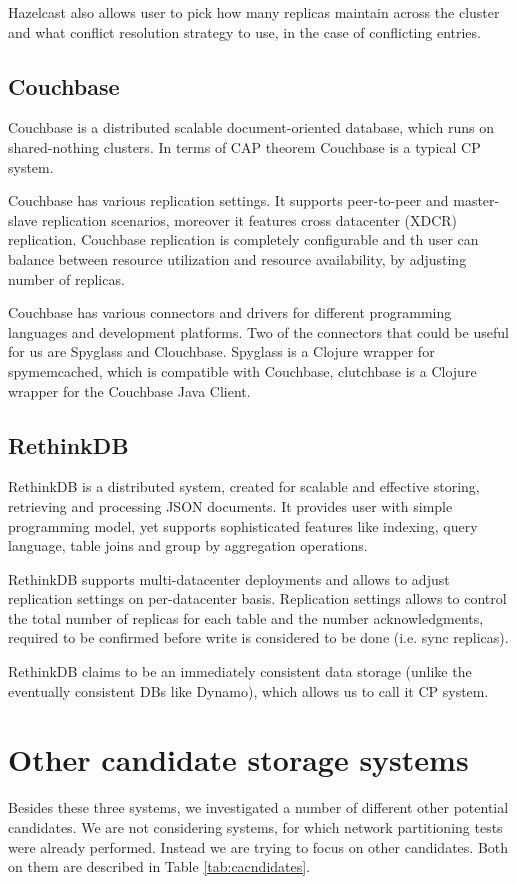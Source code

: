 \documentclass[a4paper]{article}
\begin{document}
Hazelcast also allows user to pick how many replicas maintain across the cluster and what conflict resolution strategy to use, in the case of conflicting entries.  

\subsection*{Couchbase}

Couchbase is a distributed scalable document-oriented database, which runs on shared-nothing clusters.
In terms of CAP theorem Couchbase is a typical CP system.

Couchbase has various replication settings.
It supports peer-to-peer and master-slave replication scenarios, moreover it features cross datacenter (XDCR) replication.
Couchbase replication is completely configurable and th user can balance between resource utilization and resource availability, by adjusting number of replicas.

Couchbase has various connectors and drivers for different programming languages and development platforms. 
Two of the connectors that could be useful for us are Spyglass and Clouchbase. 
Spyglass is a Clojure wrapper for spymemcached, which is compatible with Couchbase, clutchbase is a Clojure wrapper for the Couchbase Java Client.

\subsection*{RethinkDB}

RethinkDB is a distributed system, created for scalable and effective storing, retrieving and processing JSON documents.
It provides user with simple programming model, yet supports sophisticated features like indexing, query language, table joins and group by aggregation operations.

RethinkDB supports multi-datacenter deployments and allows to adjust replication settings on per-datacenter basis.
Replication settings allows to control the total number of replicas for each table and the number acknowledgments, required to be confirmed before write is considered to be done (i.e. sync replicas).

RethinkDB claims to be an immediately consistent data storage (unlike the eventually consistent DBs like Dynamo), which allows us to call it CP system.

\section{Other candidate storage systems}
\label{sec:others}
Besides these three systems, we investigated a number of different other potential candidates.
We are not considering systems, for which network partitioning tests were already performed.
Instead we are trying to focus on other candidates.
Both on them are described in Table \ref{tab:cacndidates}.
\end{document}
